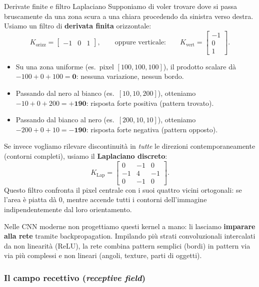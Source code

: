 \documentclass[12pt]{extarticle}
\begin{document}
\begin{esempiobox}{Derivate finite e filtro Laplaciano}
Supponiamo di voler trovare dove si passa bruscamente da una zona scura a una chiara procedendo da sinistra verso destra. Usiamo un filtro di \textbf{derivata finita} orizzontale:
\[
K_{\text{orizz}} = \begin{bmatrix} -1 & 0 & 1 \end{bmatrix},
\qquad\text{oppure verticale:}\qquad
K_{\text{vert}} = \begin{bmatrix} -1 \\ 0 \\ 1 \end{bmatrix}.
\]
\begin{itemize}
    \item Su una zona uniforme (es.\ pixel $[100, 100, 100]$), il prodotto scalare dà $-100 + 0 + 100 = \mathbf{0}$: nessuna variazione, nessun bordo.
    \item Passando dal nero al bianco (es.\ $[10, 10, 200]$), otteniamo $-10 + 0 + 200 = \mathbf{+190}$: risposta forte positiva (pattern trovato).
    \item Passando dal bianco al nero (es.\ $[200, 10, 10]$), otteniamo $-200 + 0 + 10 = \mathbf{-190}$: risposta forte negativa (pattern opposto).
\end{itemize}

\smallskip\noindent Se invece vogliamo rilevare discontinuità in \emph{tutte} le direzioni contemporaneamente (contorni completi), usiamo il \textbf{Laplaciano discreto}:
\[
K_{\text{Lap}} = \begin{bmatrix} 0 & -1 & 0 \\ -1 & 4 & -1 \\ 0 & -1 & 0 \end{bmatrix}.
\]
Questo filtro confronta il pixel centrale con i suoi quattro vicini ortogonali: se l'area è piatta dà $0$, mentre accende tutti i contorni dell'immagine indipendentemente dal loro orientamento.
\end{esempiobox}

\noindent Nelle CNN moderne non progettiamo questi kernel a mano: li lasciamo \textbf{imparare alla rete} tramite backpropagation. Impilando più strati convoluzionali intercalati da non linearità (ReLU), la rete combina pattern semplici (bordi) in pattern via via più complessi e non lineari (angoli, texture, parti di oggetti).

\subsubsection{Il campo recettivo (\emph{receptive field})}
\end{document}
